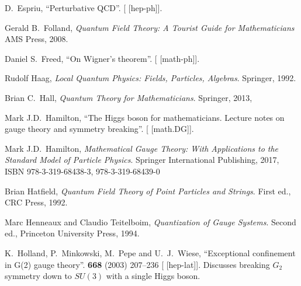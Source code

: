 \begin{thebibliography}{99}
D.~Espriu,
``Perturbative QCD''.
[ [hep-ph]].

Gerald B.~Folland,
\textit{Quantum Field Theory: A Tourist Guide for Mathematicians}
AMS Press, 2008.

Daniel S.~Freed,
``On Wigner's theorem''.
[ [math-ph]].

Rudolf Haag,
\textit{Local Quantum Physics: Fields, Particles, Algebras}.
Springer, 1992.

Brian C.~Hall,
\textit{Quantum Theory for Mathematicians}.
Springer, 2013,
{\tt{}}

Mark J.D.\ Hamilton,
``The Higgs boson for mathematicians. Lecture notes on gauge theory and symmetry breaking''.
[ [math.DG]].

Mark J.D.\ Hamilton,
\textit{Mathematical Gauge Theory: With Applications to the Standard Model of Particle Physics}.
Springer International Publishing, 2017,
ISBN 978-3-319-68438-3, 978-3-319-68439-0
{\tt{}}

Brian Hatfield,
\textit{Quantum Field Theory of Point Particles and Strings}.
First ed., CRC Press, 1992.

Marc Henneaux and Claudio Teitelboim,
\textit{Quantization of Gauge Systems}.
Second ed., Princeton University Press, 1994.

K.~Holland, P.~Minkowski, M.~Pepe and U.~J.~Wiese,
``Exceptional confinement in G(2) gauge theory''.
 \textbf{668} (2003) 207--236
{\tt{}}
[ [hep-lat]].
Discusses breaking $G_{2}$ symmetry down to $SU(3)$ with a single Higgs boson.


\end{thebibliography}
